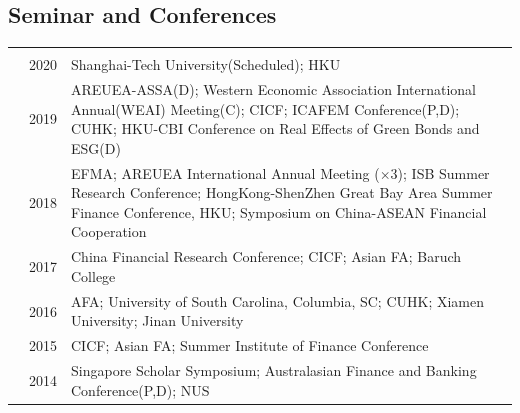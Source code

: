 \documentclass[margin,line]{res}
\begin{document}
\begin{resume}
\section{\sc Seminar and Conferences}
\vspace{.05in}
\begin{tabular}{@{}p{0.20in}p{0.20in}p{5.00in}}
	&\multicolumn{2}{l}{} \\
	& 2020   & Shanghai-Tech University(Scheduled); HKU\\		\vspace*{0.2cm}	
	& 2019   & AREUEA-ASSA(D); Western Economic Association International Annual(WEAI) Meeting(C); CICF; ICAFEM Conference(P,D); CUHK; HKU-CBI Conference on Real Effects of Green Bonds and ESG(D)\\		
	&2018    & EFMA; AREUEA International Annual Meeting ($\times$3); ISB Summer Research Conference; HongKong-ShenZhen Great Bay Area Summer Finance Conference, HKU; Symposium on China-ASEAN Financial Cooperation\\ 	
	& 2017   & China Financial Research Conference; CICF; Asian FA; Baruch College\\
	& 2016  & AFA; University of South Carolina, Columbia, SC; CUHK; Xiamen University; Jinan University \\
	& 2015   &  CICF; Asian FA; Summer Institute of Finance Conference\\
	& 2014   &  Singapore Scholar Symposium; Australasian Finance and Banking Conference(P,D); NUS	
	
\end{tabular}
%	


\end{resume}
\end{document}
